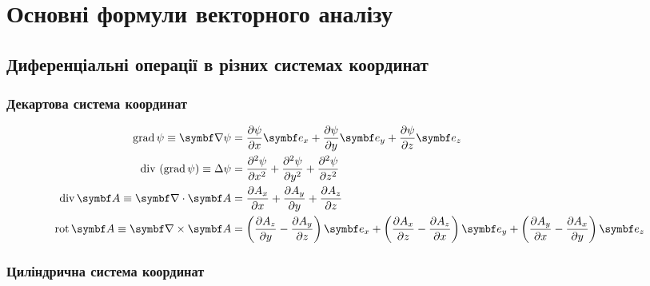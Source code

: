 
\section{Основні формули векторного аналізу}\label{Vanaliz}

\subsection{Диференціальні операції в різних системах координат}

\subsubsection{Декартова система координат}

\begin{align}\label{cartesian}
	\mathrm{grad}\,\psi \equiv \vect{\nabla}\psi & = \frac{\partial \psi}{\partial x} \vect{e}_x + \frac{\partial \psi}{\partial y} \vect{e}_y +
	\frac{\partial \psi}{\partial z} \vect{e}_z \\
	\mathrm{div}\,\left(\mathrm{grad}\,\psi\right) \equiv \Laplasian\psi    & = \frac{\partial^2 \psi}{\partial x^2} + \frac{\partial^2 \psi}{\partial y^2} + \frac{\partial^2 \psi }{\partial z^2}               \\
	\mathrm{div}\,\vect{A} \equiv \divg\vect{A}     & = \frac{\partial A_x}{\partial x}  + \frac{\partial A_y}{\partial y} + \frac{\partial A_z}{\partial z}                              \\
	\mathrm{rot}\,\vect{A} \equiv  \rot\vect{A}      & = \left( \frac{\partial A_z}{\partial y}  - \frac{\partial A_y}{\partial z}\right)  \vect{e}_x +
	\left( \frac{\partial A_x}{\partial z}  - \frac{\partial A_z}{\partial x}\right)  \vect{e}_y +
	\left( \frac{\partial A_y}{\partial x}  - \frac{\partial A_x}{\partial y}\right)  \vect{e}_z
\end{align}

\subsubsection{Циліндрична система координат}


